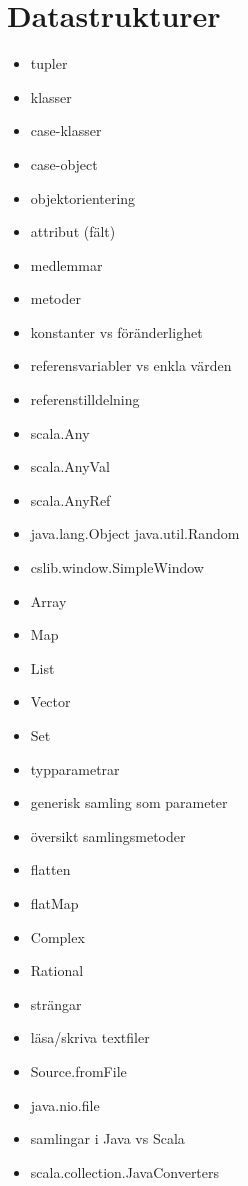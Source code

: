 \chapter{Datastrukturer}\label{chapter:W04}
\begin{itemize}[nosep]
\item tupler
\item klasser
\item case-klasser
\item case-object
\item objektorientering
\item attribut (fält)
\item medlemmar
\item metoder
\item konstanter vs föränderlighet
\item referensvariabler vs enkla värden
\item referenstilldelning
\item scala.Any
\item scala.AnyVal
\item scala.AnyRef
\item java.lang.Object java.util.Random
\item cslib.window.SimpleWindow
\item Array
\item Map
\item List
\item Vector
\item Set
\item typparametrar
\item generisk samling som parameter
\item översikt samlingsmetoder
\item flatten
\item flatMap
\item Complex
\item Rational
\item strängar
\item läsa/skriva textfiler
\item Source.fromFile
\item java.nio.file
\item samlingar i Java vs Scala
\item scala.collection.JavaConverters
\end{itemize}